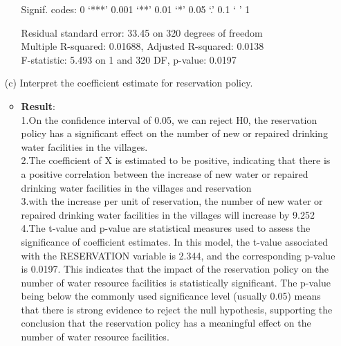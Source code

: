 \documentclass[12pt,letterpaper]{article}
\begin{document}
\begin{enumerate}
\begin{itemize}
		Signif. codes:  
		0 ‘***’ 0.001 ‘**’ 0.01 ‘*’ 0.05 ‘.’ 0.1 ‘ ’ 1
		
		Residual standard error: 33.45 on 320 degrees of freedom\\
		Multiple R-squared:  0.01688,	Adjusted R-squared:  0.0138 \\
		F-statistic: 5.493 on 1 and 320 DF,  p-value: 0.0197
		
	\end{itemize}
	
	
	\vspace{1cm}
	\item [(c)] Interpret the coefficient estimate for reservation policy. 
		\begin{itemize}
		\item \textbf{Result}:\\
		1.On the confidence interval of 0.05, we can reject H0, the reservation policy has a significant effect on the number of new or repaired drinking water facilities in the villages.\\
		2.The coefficient of X is estimated to be positive, indicating that there is a positive correlation between the  increase of new water or repaired drinking water facilities in the villages and reservation\\
		3.with the increase per unit of reservation, the number of new water or repaired drinking water facilities in the villages will increase by 9.252\\
		4.The t-value and p-value are statistical measures used to assess the significance of coefficient estimates. In this model, the t-value associated with the RESERVATION variable is 2.344, and the corresponding p-value is 0.0197. This indicates that the impact of the reservation policy on the number of water resource facilities is statistically significant. The p-value being below the commonly used significance level (usually 0.05) means that there is strong evidence to reject the null hypothesis, supporting the conclusion that the reservation policy has a meaningful effect on the number of water resource facilities.
	\end{itemize}
\end{enumerate}
\end{document}
